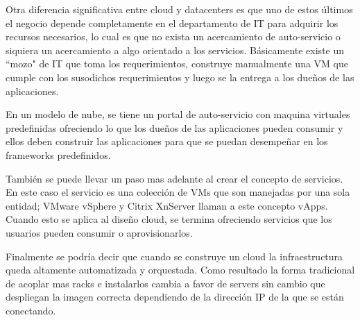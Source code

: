\documentclass[12pt,a4paper]{article}
\begin{document}
Otra diferencia significativa entre cloud y datacenters es que uno de estos últimos el negocio 
depende completamente en el departamento de IT para adquirir los recursos necesarios, lo cual es que
no exista un acercamiento de auto-servicio o siquiera un acercamiento a algo orientado a los 
servicios. Básicamente existe un ``mozo" de IT que toma los requerimientos, construye manualmente una
VM que cumple con los susodichos requerimientos y luego se la entrega a los dueños de las 
aplicaciones.

En un modelo de nube, se tiene un portal de auto-servicio con maquina virtuales predefinidas 
ofreciendo lo que los dueños de las aplicaciones pueden consumir y ellos deben construir las 
aplicaciones para que se puedan desempeñar en los frameworks predefinidos. 

También se puede llevar un paso mas adelante al crear el concepto de servicios. En este caso el 
servicio es una colección de VMs que son manejadas por una sola entidad; VMware vSphere y Citrix 
XnServer llaman a este concepto vApps. Cuando esto se aplica al diseño cloud, se termina ofreciendo
servicios que los usuarios pueden consumir o aprovisionarlos.

Finalmente se podría decir que cuando se construye un cloud la infraestructura queda altamente 
automatizada y orquestada. Como resultado la forma tradicional de acoplar mas racks e instalarlos 
cambia a favor de servers sin cambio que despliegan la imagen correcta dependiendo de la dirección IP
de la que se están conectando.
\end{document}
